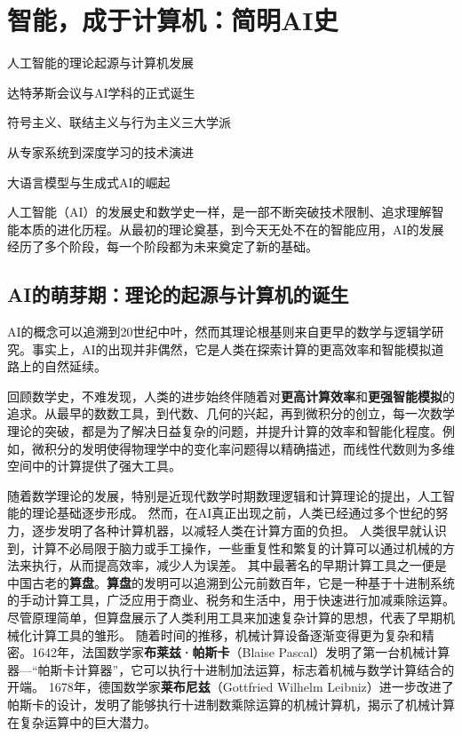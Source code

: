 \chapter{智能，成于计算机：简明AI史}

\begin{introduction}
  \item 人工智能的理论起源与计算机发展
  \item 达特茅斯会议与AI学科的正式诞生
  \item 符号主义、联结主义与行为主义三大学派
  \item 从专家系统到深度学习的技术演进
  \item 大语言模型与生成式AI的崛起
\end{introduction}


                
人工智能（AI）的发展史和数学史一样，是一部不断突破技术限制、追求理解智能本质的进化历程。从最初的理论奠基，到今天无处不在的智能应用，AI的发展经历了多个阶段，每一个阶段都为未来奠定了新的基础。

\section{AI的萌芽期：理论的起源与计算机的诞生}
AI的概念可以追溯到20世纪中叶，然而其理论根基则来自更早的数学与逻辑学研究。事实上，AI的出现并非偶然，它是人类在探索计算的更高效率和智能模拟道路上的自然延续。

回顾数学史，不难发现，人类的进步始终伴随着对{\bf 更高计算效率}和{\bf 更强智能模拟}的追求。从最早的数数工具，到代数、几何的兴起，再到微积分的创立，每一次数学理论的突破，都是为了解决日益复杂的问题，并提升计算的效率和智能化程度。例如，微积分的发明使得物理学中的变化率问题得以精确描述，而线性代数则为多维空间中的计算提供了强大工具。

随着数学理论的发展，特别是近现代数学时期数理逻辑和计算理论的提出，人工智能的理论基础逐步形成。
然而，在AI真正出现之前，人类已经通过多个世纪的努力，逐步发明了各种计算机器，以减轻人类在计算方面的负担。
人类很早就认识到，计算不必局限于脑力或手工操作，一些重复性和繁复的计算可以通过机械的方法来执行，从而提高效率，减少人为误差。
其中最著名的早期计算工具之一便是中国古老的{\bf 算盘}。{\bf 算盘}的发明可以追溯到公元前数百年，它是一种基于十进制系统的手动计算工具，广泛应用于商业、税务和生活中，用于快速进行加减乘除运算。尽管原理简单，但算盘展示了人类利用工具来加速复杂计算的思想，代表了早期机械化计算工具的雏形。
随着时间的推移，机械计算设备逐渐变得更为复杂和精密。1642年，法国数学家{\bf 布莱兹·帕斯卡}（Blaise Pascal）发明了第一台机械计算器---“帕斯卡计算器”，它可以执行十进制加法运算，标志着机械与数学计算结合的开端。
1678年，德国数学家{\bf 莱布尼兹}（Gottfried Wilhelm Leibniz）进一步改进了帕斯卡的设计，发明了能够执行十进制数乘除运算的机械计算机，揭示了机械计算在复杂运算中的巨大潜力。

